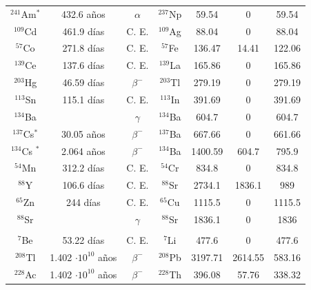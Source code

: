 \begin{table}[h]
\begin{tabular}{|c|c|c|c|c|c|c|}
\rowcolor{Blue1}	\cellcolor{Green3}	$^{241}$Am$^{*}$	&	432.6 años	&	$\alpha$	&	 	$^{237}$Np	 	&	 	59.54	 	&	 	0	 	&	\cellcolor{Green3} 59.54	\\ 	
\rowcolor{Blue1}		 	$^{109}$Cd	 	&	 	461.9 días 	 	&	C. E.	&	 	$^{109}$Ag	 	&	 	88.04	 	&	 	0	 	&	88.04	\\ 	
\rowcolor{Blue1}		 	$^{57}$Co	 	&	 	271.8 días	 	&	C. E.	&	 	$^{57}$Fe	 	&	 	136.47	 	&	 	14.41	 	&	122.06	\\ 	
\rowcolor{Blue1}		 	$^{139}$Ce	 	&	 	137.6 días	 	&	C. E.	&	 	$^{139}$La	 	&	 	165.86	 	&	 	0	 	&	165.86	\\ 	
\rowcolor{Blue1}		 	$^{203}$Hg	 	&	 	46.59 días	 	&	$\beta^-$	&	 	$^{203}$Tl	 	&	 	279.19	 	&	 	0	 	&	279.19	\\ 	
\rowcolor{Blue1}		 	$^{113}$Sn	 	&	 	115.1 días	 	&	C. E.	&	 	$^{113}$In	 	&	 	391.69	 	&	 	0	 	&	391.69	\\ 	
\rowcolor{Blue1}		 	$^{134}$Ba	 	&	 		 	&	$\gamma$	&	 	$^{134}$Ba	 	&	 	604.7	 	&	 	0	 	&	604.7	\\ 	
\rowcolor{Blue1}	\cellcolor{Green3}	 	$^{137}$Cs$^{*}$	 	&	 	30.05 años	 	&	$\beta^-$	&	 	$^{137}$Ba	 	&	 	667.66	 	&	 	0	 	&	\cellcolor{Green3} 661.66	\\ 	
\rowcolor{Blue1}	\cellcolor{Green3}	 	$^{134}$Cs	$^{*}$ 	&	 	2.064 años	 	&	$\beta^-$	&	 	$^{134}$Ba	 	&	 	1400.59	 	&	 	604.7	 	&	\cellcolor{Green3} 795.9	\\ 	
\rowcolor{Blue1}		 	$^{54}$Mn	 	&	 	312.2 días	 	&	C. E.	&	 	$^{54}$Cr	 	&	 	834.8	 	&	 	0	 	&	834.8	\\ 	
\rowcolor{Blue1}		 	$^{88}$Y	 	&	 	106.6 días	 	&	C. E.	&	 	$^{88}$Sr	 	&	 	2734.1	 	&	 	1836.1	 	&	989	\\ 	
\rowcolor{Blue1}		 	$^{65}$Zn	 	&	 	244 días	 	&	C. E.	&	 	$^{65}$Cu	 	&	 	1115.5	 	&	 	0	 	&	1115.5	\\ 	
\rowcolor{Blue1}		 	$^{88}$Sr	 	&	 		 	&	$\gamma$	&	 	$^{88}$Sr	 	&	 	1836.1	 	&	 	0	 	&	1836	\\ 	\hline
\rowcolor{Blue2}		 \multicolumn{7}{|c|}{Radionúclidos de interés para el LGIG}           													\\ 	\hline
\rowcolor{Blue1}	\cellcolor{Green3}	$^{7}$Be	&	53.22 días 	&	C. E.	&	$^{7}$Li	&	477.6	&	0	&	\cellcolor{Green3} 477.6	\\ 	
\rowcolor{Blue1}	\cellcolor{Green3}	$^{208}$Tl	&	1.402 $\cdot 10^{10}$ años	&	$\beta^-$	&	$^{208}$Pb	&	3197.71	&	2614.55	&	\cellcolor{Green3} 583.16	\\ 	
\rowcolor{Blue1}	\cellcolor{Green3}	$^{228}$Ac	&	1.402 $\cdot 10^{10}$ años	&	$\beta^-$	&	$^{228}$Th	&	396.08	&	57.76	&	\cellcolor{Green3} 338.32	\\ 	

\end{tabular}
\end{table}

